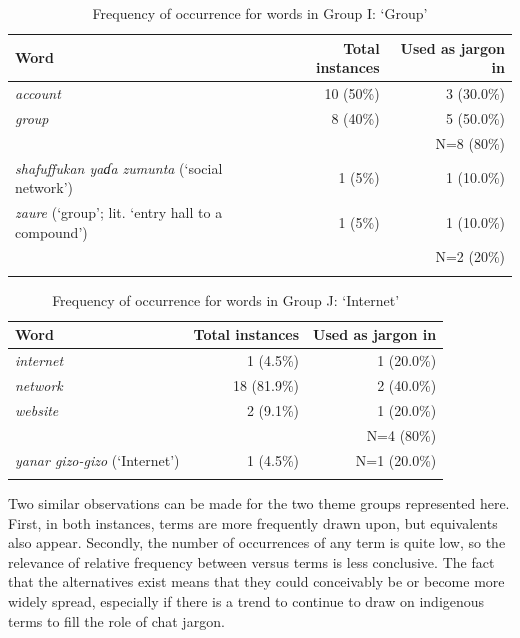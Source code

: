 \documentclass[output=paper,newtxmath,modfonts,nonflat,hidelinks]{langsci/langscibook}
\begin{document}
\begin{table}
\begin{tabularx}{\textwidth}{Qrr}
\lsptoprule
Word & Total instances & Used as jargon in \\
\midrule
\textit{account} & 10 (50\%) & 3 (30.0\%)\\
\textit{group}   & 8 (40\%) & 5 (50.0\%)\\\midrule
& & N=8 (80\%)\\\midrule
\textit{shafuffukan yaɗa zumunta} (‘social network’)      & 1 (5\%) & 1 (10.0\%)\\
\textit{zaure} (‘group’; lit. ‘entry hall to a compound’) & 1 (5\%) & 1 (10.0\%)\\\midrule
& & N=2 (20\%)\\
\lspbottomrule
\end{tabularx}
\caption{Frequency of occurrence for words in Group I: ‘Group’}
\label{tab:purvis:11}
\end{table} 

\begin{table}
\begin{tabularx}{\textwidth}{Qrr}
\lsptoprule
Word &  Total instances & Used as jargon in \\
\midrule
\textit{internet} & 1 (4.5\%) & 1 (20.0\%)\\
\textit{network}  & 18 (81.9\%) & 2 (40.0\%)\\
\textit{website}  & 2 (9.1\%) & 1 (20.0\%)\\\midrule
& & N=4 (80\%)\\\midrule
\textit{yanar gizo-gizo} (‘Internet’) & 1 (4.5\%) & N=1 (20.0\%)\\
\lspbottomrule
\end{tabularx}
\caption{Frequency of occurrence for words in Group J: ‘Internet’}
\label{tab:purvis:12}
\end{table} 

Two similar observations can be made for the two theme groups represented here. First, in both instances,  terms are more frequently drawn upon, but  equivalents also appear. Secondly, the number of occurrences of any term is quite low, so the relevance of relative frequency between  versus  terms is less conclusive. The fact that the  alternatives exist means that they could conceivably be or become more widely spread, especially if there is a trend to continue to draw on indigenous terms to fill the role of chat jargon. 
\end{document}
